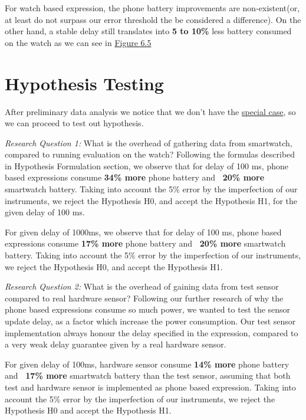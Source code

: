 For watch based expression, the phone battery improvements are non-existent(or, at least do not surpass our error threshold the be considered a difference). On the other hand,
a stable delay still translates into \textbf{ 5 to 10\%} less battery consumed on the watch as we can see in \hyperref[fig:wear_expr_consumption]{Figure 6.5}

\section{Hypothesis Testing}
After preliminary data analysis we notice that we don't have the \hyperref[special_case]{special case}, so we can proceed to test out hypothesis.

\textit{Research Question 1:} What is the overhead of gathering data from smartwatch, compared to running evaluation on the watch? \newline
Following the formulas described in Hypothesis Formulation section, we observe that for delay of 100 ms, phone based expressions consume 
\textbf{34\% more} phone battery and \textbf{~20\% more } smartwatch battery. Taking into account the 5\% error by the imperfection of our instruments,
we reject the Hypothesis H0, and accept the Hypothesis H1, for the given delay of 100 ms.

For given delay of 1000ms, we observe that for delay of 100 ms, phone based expressions consume 
\textbf{17\% more} phone battery and \textbf{~20\% more } smartwatch battery. Taking into account the 5\% error by the imperfection of our instruments,
we reject the Hypothesis H0, and accept the Hypothesis H1.

 \textit{Research Question 2:}  What is the overhead of gaining data from test sensor compared to real hardware sensor?\newline
Following our further research of why the phone based expressions consume so much power, we wanted to test the sensor update delay, as a factor
which increase the power consumption. Our test sensor implementation always honour the delay specified in the expression, compared to a very weak delay guarantee
given by a real hardware sensor.

For given delay of 100ms, hardware sensor consume \textbf{14\% more} phone battery and \textbf{~17\% more } smartwatch battery than the test sensor, assuming that both test and hardware
sensor is implemented as phone based expression.
Taking into account the 5\% error by the imperfection of our instruments, we reject the Hypothesis H0 and accept the Hypothesis H1.

